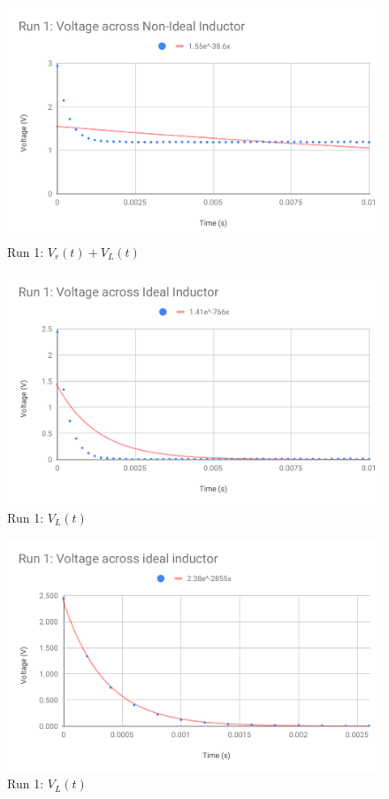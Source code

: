 %
\begin{figure}[ht]
    \centering
    \includegraphics[scale=0.74]{image/05-RC-RL/vL-non-ideal-full.pdf}
    \caption{Run 1: $V_{r}(t) + V_{L}(t)$}
    \label{figure.05.vL.nonideal.full}
\end{figure}
%
\begin{figure}[ht]
    \centering
    \includegraphics[scale=0.74]{image/05-RC-RL/vL-full.pdf}
    \caption{Run 1: $V_{L}(t)$}
    \label{figure.05.vL.full}
\end{figure}
%
\begin{figure}[ht]
    \centering
    \includegraphics[scale=0.74]{image/05-RC-RL/run-1-vL.pdf}
    \caption{Run 1: $V_{L}(t)$}
    \label{figure.05.run.1.vL}
\end{figure}